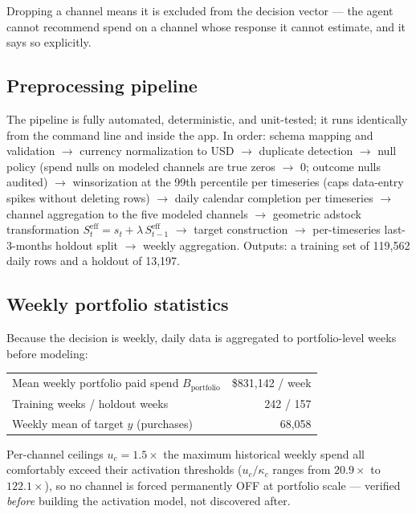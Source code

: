\documentclass[11pt]{article}
\begin{document}
Dropping a channel means it is excluded from the decision vector --- the agent cannot recommend spend on a channel whose response it cannot estimate, and it says so explicitly.

\subsection{Preprocessing pipeline}

The pipeline is fully automated, deterministic, and unit-tested; it runs identically from the command line and inside the app. In order: schema mapping and validation $\rightarrow$ currency normalization to USD $\rightarrow$ duplicate detection $\rightarrow$ null policy (spend nulls on modeled channels are true zeros $\rightarrow$ 0; outcome nulls audited) $\rightarrow$ winsorization at the 99th percentile per timeseries (caps data-entry spikes without deleting rows) $\rightarrow$ daily calendar completion per timeseries $\rightarrow$ channel aggregation to the five modeled channels $\rightarrow$ geometric adstock transformation $S^{\text{eff}}_t = s_t + \lambda\, S^{\text{eff}}_{t-1}$ $\rightarrow$ target construction $\rightarrow$ per-timeseries last-3-months holdout split $\rightarrow$ weekly aggregation. Outputs: a training set of 119{,}562 daily rows and a holdout of 13{,}197.

\subsection{Weekly portfolio statistics}

Because the decision is weekly, daily data is aggregated to portfolio-level weeks before modeling:

\begin{center}
\begin{tabular}{lr}
\toprule
Mean weekly portfolio paid spend $B_{\text{portfolio}}$ & \$831{,}142 / week \\
Training weeks / holdout weeks & 242 / 157 \\
Weekly mean of target $y$ (purchases) & 68{,}058 \\
\bottomrule
\end{tabular}
\end{center}

Per-channel ceilings $u_c = 1.5\times$ the maximum historical weekly spend all comfortably exceed their activation thresholds ($u_c/\kappa_c$ ranges from $20.9\times$ to $122.1\times$), so no channel is forced permanently OFF at portfolio scale --- verified \emph{before} building the activation model, not discovered after.
\end{document}
